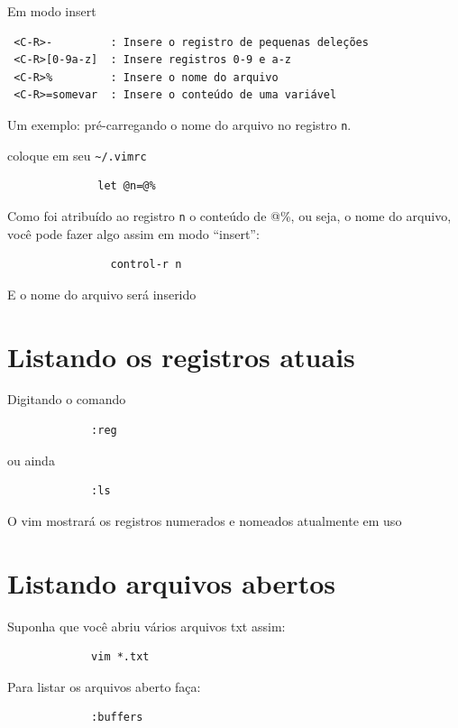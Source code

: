 \documentclass[10pt,a4paper,openany]{book}
\begin{document}
Em modo insert

\begin{verbatim}
 <C-R>-         : Insere o registro de pequenas deleções
 <C-R>[0-9a-z]  : Insere registros 0-9 e a-z
 <C-R>%         : Insere o nome do arquivo
 <C-R>=somevar  : Insere o conteúdo de uma variável
\end{verbatim}


Um exemplo: pré-carregando o nome do arquivo no registro \verb+n+.

coloque em seu \verb+~/.vimrc+

\begin{verbatim}
			  let @n=@%
\end{verbatim}

Como foi atribuído ao registro \verb+n+ o conteúdo de @\%, ou seja, o nome
do arquivo, você pode fazer algo assim em modo ``insert'':

\begin{verbatim}
				control-r n
\end{verbatim}

E o nome do arquivo será inserido

\section{Listando os registros atuais}
\label{Listando os registros atuais}
Digitando o comando

\begin{verbatim}
			 :reg
\end{verbatim}

ou ainda

\begin{verbatim}
			 :ls
\end{verbatim}

O vim mostrará os registros numerados e nomeados atualmente em uso

\section{Listando arquivos abertos}
\label{Listando arquivos abertos}
Suponha que você abriu vários arquivos txt assim:

\begin{verbatim}
			 vim *.txt
\end{verbatim}

Para listar os arquivos aberto faça:

\begin{verbatim}
			 :buffers
\end{verbatim}
\end{document}
